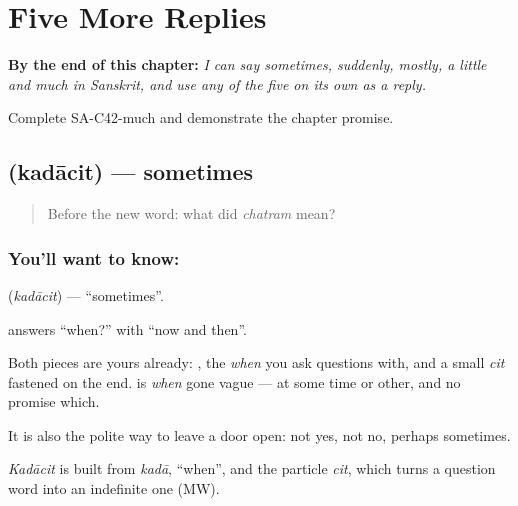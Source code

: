 
\chapter{Five More Replies}
\label{ch:sa-replies-third}

\begin{chapteropening}
\textbf{By the end of this chapter:} \emph{I can say sometimes, suddenly, mostly, a little and much in Sanskrit, and use any of the five on its own as a reply.}

Complete SA-C42-much and demonstrate the chapter promise.
\end{chapteropening}

\section[\texorpdfstring{\sk{कदाचित्} (kadācit)}{कदाचित् (kadācit)}]{ (kadācit) — sometimes}

\label{lesson:SA-C42-sometimes}



\begin{quote}
Before the new word: what did \emph{chatram} mean?
\end{quote}

\subsection*{You'll want to know: }
\textbf{} (\emph{kadācit}) — \textquotedblleft{}sometimes\textquotedblright{}.

\textbf{} answers \textquotedblleft{}when?\textquotedblright{} with \textquotedblleft{}now and then\textquotedblright{}.

Both pieces are yours already: , the \emph{when} you ask questions with, and a small \emph{cit} fastened on the end. \textbf{} is \emph{when} gone vague — at some time or other, and no promise which.

It is also the polite way to leave a door open: not yes, not no, perhaps sometimes.

\begin{cousinweb}
\emph{Kadācit} is built from \emph{kadā}, \textquotedblleft{}when\textquotedblright{}, and the particle \emph{cit}, which turns a question word into an indefinite one (MW).
\end{cousinweb}

